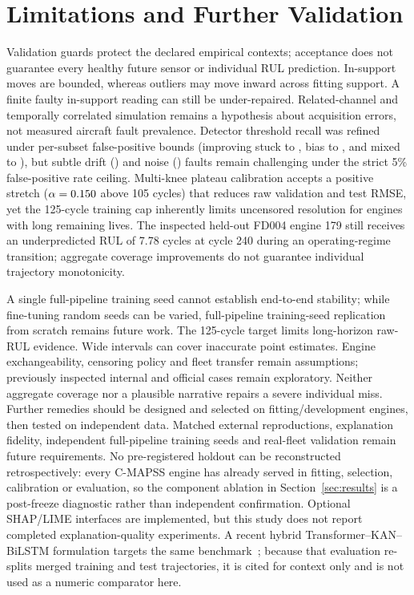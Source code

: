 \documentclass[conference]{IEEEtran}
\begin{document}
\section{\textbf{Limitations and Further Validation}}
Validation guards protect the declared empirical contexts; acceptance does not
guarantee every healthy future sensor or individual RUL prediction. In-support
moves are bounded, whereas outliers may move inward across fitting support.
A finite faulty in-support reading can still be under-repaired. Related-channel
and temporally correlated simulation remains a hypothesis about acquisition
errors, not measured aircraft fault prevalence. Detector threshold recall was refined under per-subset false-positive bounds
(improving stuck to \CurrentRecallStuck{}, bias to \CurrentRecallBias{}, and mixed to \CurrentRecallMixed{}), but subtle drift (\CurrentRecallDrift{})
and noise (\CurrentRecallNoise{}) faults remain challenging under the strict 5\% false-positive
rate ceiling. Multi-knee plateau calibration accepts a positive stretch
($\alpha=0.150{}$ above 105 cycles) that reduces raw validation and test RMSE, yet
the 125-cycle training cap inherently limits uncensored resolution for engines with
long remaining lives. The inspected held-out FD004 engine 179 still receives an
underpredicted RUL of 7.78 cycles at cycle 240 during an operating-regime transition;
aggregate coverage improvements do not guarantee individual trajectory monotonicity.

A single full-pipeline training seed cannot establish end-to-end stability;
while fine-tuning random seeds can be varied, full-pipeline training-seed
replication from scratch remains future work. The 125-cycle target limits
long-horizon raw-RUL evidence. Wide intervals can cover inaccurate point estimates.
Engine exchangeability, censoring policy and fleet transfer remain assumptions;
previously inspected internal and official cases remain exploratory. Neither
aggregate coverage nor a plausible narrative repairs a severe individual miss.
Further remedies should be designed and selected on fitting/development engines,
then tested on independent data. Matched external reproductions, explanation fidelity, independent full-pipeline training seeds
and real-fleet validation remain future requirements. No pre-registered holdout can be
reconstructed retrospectively: every C-MAPSS engine has already served in
fitting, selection, calibration or evaluation, so the component ablation in
Section~\ref{sec:results} is a post-freeze diagnostic rather than independent
confirmation. Optional SHAP/LIME interfaces are implemented, but this study does
not report completed explanation-quality experiments. A recent hybrid
Transformer--KAN--BiLSTM formulation targets the same benchmark~\cite{xu2026kan};
because that evaluation re-splits merged training and test trajectories, it is
cited for context only and is not used as a numeric comparator here.
\end{document}
